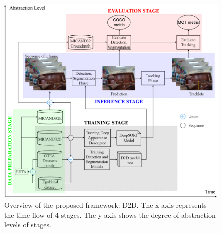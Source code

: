  \begin{figure}[htbp]
\centerline{\includegraphics[width=1\linewidth]{Figs/proposedFramework.png}}
\caption{Overview of the proposed framework: D2D. The x-axis represents the time flow of 4 stages. The y-axis shows the degree of abstraction levels of stages.}
\label{fig:framework}
\end{figure}

